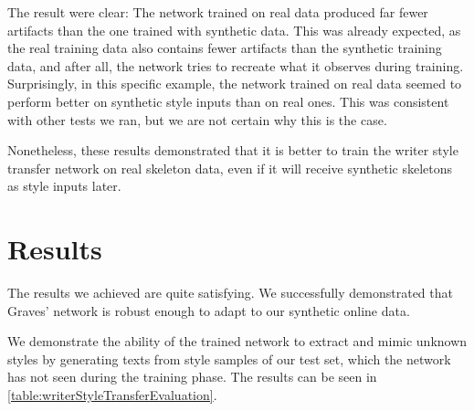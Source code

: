The result were clear: The network trained on real data produced far fewer artifacts than the one trained with synthetic data. This was already expected, as the real training data also contains fewer artifacts than the synthetic training data, and after all, the network tries to recreate what it observes during training. Surprisingly, in this specific example, the network trained on real data seemed to perform better on synthetic style inputs than on real ones. This was consistent with other tests we ran, but we are not certain why this is the case.

Nonetheless, these results demonstrated that it is better to train the writer style transfer network on real skeleton data, even if it will receive synthetic skeletons as style inputs later.

\section{Results}

The results we achieved are quite satisfying. We successfully demonstrated that Graves' network is robust enough to adapt to our synthetic online data.

We demonstrate the ability of the trained network to extract and mimic unknown styles by generating texts from style samples of our test set, which the network has not seen during the training phase. The results can be seen in \cref{table:writerStyleTransferEvaluation}.


